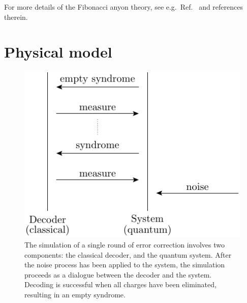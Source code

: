 For more details of the Fibonacci anyon
theory, see e.g.\ Ref.~\cite{Nayak2008} and references therein.



%
%

\section{Physical model}

\begin{figure}
\begin{center}
\includegraphics[]{pic-process.pdf}
\end{center}
\caption{
The simulation of a single round of
error correction involves two components: 
the classical decoder, and the quantum system.
After the noise process has been applied to the
system, the simulation proceeds as a dialogue between
the decoder and the system. 
Decoding is successful when all charges have been eliminated,
resulting in an empty syndrome.
}
\label{PicProcess}
\end{figure}


